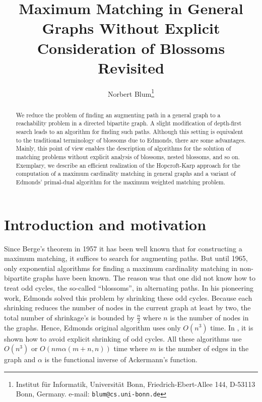 \documentclass[12pt,twoside,a4paper]{article}
\title{Maximum Matching in General Graphs Without Explicit Consideration 
of Blossoms Revisited}
\author{Norbert Blum\thanks{Institut f\"ur Informatik, Universit\"at Bonn, Friedrich-Ebert-Allee 144, D-53113 Bonn, Germany.
    e-mail:{ \tt blum@cs.uni-bonn.de}}}
\begin{document}
\date{}
\maketitle
\begin{abstract}
\noindent 
We reduce the problem of finding an augmenting path in a general
graph to a reachability problem in a directed bipartite graph. 
A slight modification of depth-first search leads to an algorithm for 
finding such paths.
Although this setting is equivalent to the traditional terminology of 
blossoms due to Edmonds, there are some advantages. Mainly, 
this point of view enables the description of algorithms
for the solution of matching problems without explicit analysis of
blossoms, nested blossoms, and so on. Exemplary, we describe an efficient
realization of the Hopcroft-Karp approach for the computation of a 
maximum cardinality matching in general graphs and a variant of 
Edmonds' primal-dual algorithm for the maximum weighted matching problem.
\end{abstract}


\section{Introduction and motivation}

Since Berge's theorem in 1957 \cite{Be} it has been well known that
for constructing a maximum matching, it suffices to search for augmenting
paths. But until 1965, only exponential algorithms for finding a maximum 
cardinality matching in non-bipartite graphs have been known. The reason was that 
one did not know how to treat odd cycles, the so-called ``blossoms'', in 
alternating paths.
In his pioneering work, Edmonds \cite{Ed1} solved this problem by shrinking
these odd cycles. Because each shrinking reduces the number of nodes in the
current graph at least by two, the total number of shrinkage's is bounded by
$\frac{n}{2}$ where $n$ is the number of nodes in the graphs. Hence, Edmonds
original algorithm uses only $O(n^3)$ time.
In \cite{Bal,Gab,La,WZ}, it is shown how to avoid explicit
shrinking of odd cycles. All these algorithms use $O(n^3)$ or $O(nm\alpha(m+n,n))$ 
time where $m$ is the number of edges in the graph and $\alpha$ is the functional 
inverse of Ackermann's function.
\end{document}
